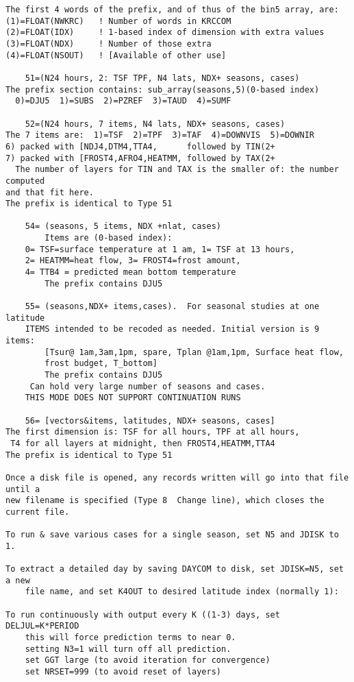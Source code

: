 \begin{verbatim}
The first 4 words of the prefix, and of thus of the bin5 array, are:
(1)=FLOAT(NWKRC)   ! Number of words in KRCCOM
(2)=FLOAT(IDX)     ! 1-based index of dimension with extra values
(3)=FLOAT(NDX)     ! Number of those extra
(4)=FLOAT(NSOUT)   ! [Available of other use]

    51=(N24 hours, 2: TSF TPF, N4 lats, NDX+ seasons, cases)
The prefix section contains: sub_array(seasons,5)(0-based index)
  0)=DJU5  1)=SUBS  2)=PZREF  3)=TAUD  4)=SUMF

    52=(N24 hours, 7 items, N4 lats, NDX+ seasons, cases)
The 7 items are:  1)=TSF  2)=TPF  3)=TAF  4)=DOWNVIS  5)=DOWNIR
6) packed with [NDJ4,DTM4,TTA4,      followed by TIN(2+
7) packed with [FROST4,AFRO4,HEATMM, followed by TAX(2+
  The number of layers for TIN and TAX is the smaller of: the number computed 
and that fit here.
The prefix is identical to Type 51

    54= (seasons, 5 items, NDX +nlat, cases)
        Items are (0-based index): 
	0= TSF=surface temperature at 1 am, 1= TSF at 13 hours,
	2= HEATMM=heat flow, 3= FROST4=frost amount, 
	4= TTB4 = predicted mean bottom temperature
        The prefix contains DJU5 

    55= (seasons,NDX+ items,cases).  For seasonal studies at one latitude
	ITEMS intended to be recoded as needed. Initial version is 9 items:
        [Tsur@ 1am,3am,1pm, spare, Tplan @1am,1pm, Surface heat flow,
        frost budget, T_bottom]
        The prefix contains DJU5	
	 Can hold very large number of seasons and cases. 
	THIS MODE DOES NOT SUPPORT CONTINUATION RUNS

    56= [vectors&items, latitudes, NDX+ seasons, cases]
The first dimension is: TSF for all hours, TPF at all hours, 
 T4 for all layers at midnight, then FROST4,HEATMM,TTA4
The prefix is identical to Type 51

Once a disk file is opened, any records written will go into that file until a
new filename is specified (Type 8  Change line), which closes the current file.
   
To run & save various cases for a single season, set N5 and JDISK to 1.

To extract a detailed day by saving DAYCOM to disk, set JDISK=N5, set a new
	file name, and set K4OUT to desired latitude index (normally 1):

To run continuously with output every K ((1-3) days, set DELJUL=K*PERIOD
	this will force prediction terms to near 0.
	setting N3=1 will turn off all prediction.
	set GGT large (to avoid iteration for convergence)
	set NRSET=999 (to avoid reset of layers)


\end{verbatim}
